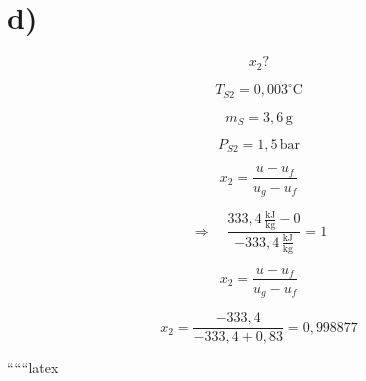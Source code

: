 

\section*{d)}

\[ x_2 ? \]

\[ T_{S2} = 0,003^\circ \text{C} \]

\[ m_S = 3,6 \, \text{g} \]

\[ P_{S2} = 1,5 \, \text{bar} \]

\[
x_2 = \frac{u - u_f}{u_g - u_f}
\]

\[
\Rightarrow \quad \frac{333,4 \, \frac{\text{kJ}}{\text{kg}} - 0}{-333,4 \, \frac{\text{kJ}}{\text{kg}}} = 1
\]

\[
x_2 = \frac{u - u_f}{u_g - u_f}
\]

\[
x_2 = \frac{-333,4}{-333,4 + 0,83} = 0,998877
\]

``````latex
